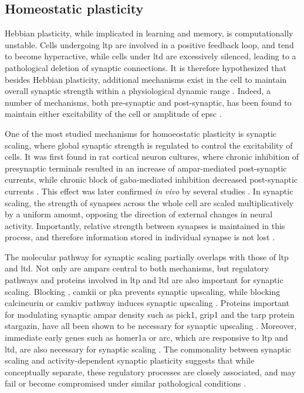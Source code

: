 \subsection{Homeostatic plasticity}
Hebbian plasticity, while implicated in learning and memory, is computationally unstable. Cells undergoing \gls{ltp} are involved in a positive feedback loop, and tend to become hyperactive, while cells under \gls{ltd} are excessively silenced, leading to a pathological deletion of synaptic connections. It is therefore hypothesized that besides Hebbian plasticity, additional mechanisms exist in the cell to maintain overall synaptic strength within a physiological dynamic range \citep{bienenstock82, cooper12}. Indeed, a number of mechanisms, both pre-synaptic and post-synaptic, has been found to maintain either excitability of the cell or amplitude of \gls{epsc} \citep{turrigiano98, frank06, collingridge10, chater14, wang16}. 

One of the most studied mechanisms for homoeostatic plasticity is synaptic scaling, where global synaptic strength is regulated to control the excitability of cells. It was first found in rat cortical neuron cultures, where chronic inhibition of presynaptic terminals resulted in an increase of \gls{ampar}-mediated post-synaptic currents, while chronic block of \gls{gaba}-mediated inhibition decreased post-synaptic currents \citep{turrigiano98}. This effect was later confirmed \textit{in vivo} by several studies \citep{whitt14}. In synaptic scaling, the strength of synapses across the whole cell are scaled multiplicatively by a uniform amount, opposing the direction of external changes in neural activity. Importantly, relative strength between synapses is maintained in this process, and therefore information stored in individual synapse is not lost \citep{turrigiano08}. 

The molecular pathway for synaptic scaling partially overlaps with those of \gls{ltp} and \gls{ltd}. Not only are \glspl{ampar} central to both mechanisms, but regulatory pathways and proteins involved in \gls{ltp} and \gls{ltd} are also important for synaptic scaling. Blocking , \gls{camkii} or \gls{pka} prevents synaptic upscaling, while blocking calcineurin or \gls{camkiv} pathway induces synaptic upscaling \citep{goel11, kim14, ibata08}. Proteins important for modulating synaptic \gls{ampar} density such as \gls{pick1}, \gls{grip1} and the \gls{tarp} protein stargazin, have all been shown to be necessary for synaptic upscaling \citep{anggono11, gainey15, louros14}. Moreover, immediate early genes such as homer1a or \gls{arc}, which are responsive to \gls{ltp} and \gls{ltd}, are also necessary for synaptic scaling \citep{hu10, gao10}. The commonality between synaptic scaling and activity-dependent synaptic plasticity suggests that while conceptually separate, these regulatory processes are closely associated, and may fail or become compromised under similar pathological conditions \citep{fernandes16}.

